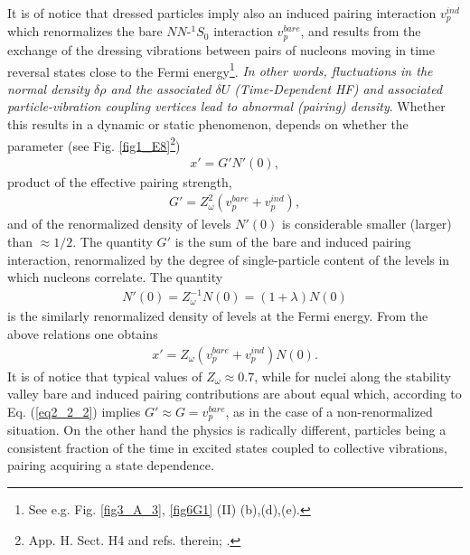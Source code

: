 It is of notice that dressed particles  imply also an induced pairing interaction $v_p^{ind}$ which renormalizes the bare $NN$-$^1S_0$ interaction $v_p^{bare}$, and results  from the exchange of the dressing vibrations between pairs of nucleons moving in time reversal states close to the Fermi energy\footnote{See e.g. Fig. \ref{fig3_A_3},  \ref{fig6G1} (II) (b),(d),(e).}. \textit{In other words, fluctuations in the normal density $\delta \rho$ and the associated $\delta U$ (Time-Dependent HF) and associated particle-vibration coupling vertices lead to abnormal (pairing) density}. Whether this results in  a dynamic or static phenomenon, depends on whether the parameter (see Fig. \ref{fig1_E8}\footnote{\cite{Brink:05} App. H. Sect. H4 and refs. therein; \cite{Barranco:05}.}) 
\begin{align}\label{eq2_1_10}
x'=G'N'(0),  
\end{align}
product of the effective pairing strength, 
\begin{align}\label{eq2_2_2}
G'=Z_\omega^2(v_p^{bare}+v_p^{ind}),
\end{align}
and of the renormalized density of levels $N'(0)$ is considerable smaller  (larger) than $\approx1/2$. The quantity $G'$ is the sum of the bare and induced pairing interaction, renormalized by the degree of single-particle content of the levels in which nucleons correlate. The quantity 
\begin{align}
N'(0)=Z_\omega^{-1}N(0)=(1+\lambda)N(0)
\end{align}
is the similarly renormalized density of levels at the Fermi energy. From the above relations one obtains 
\begin{align}
x'=Z_\omega(v_p^{bare}+v_p^{ind})N(0).
\end{align}
It is of notice that typical values of $Z_\omega\approx0.7$, while for nuclei along the stability valley bare and induced pairing contributions are about equal which, according to Eq. (\ref{eq2_2_2}) implies $G'\approx G=v^{bare}_p$, as in the case of a non-renormalized situation. On the other hand the physics is radically different, particles being a consistent fraction of the time in excited states coupled to collective vibrations, pairing acquiring a state dependence. 
 
